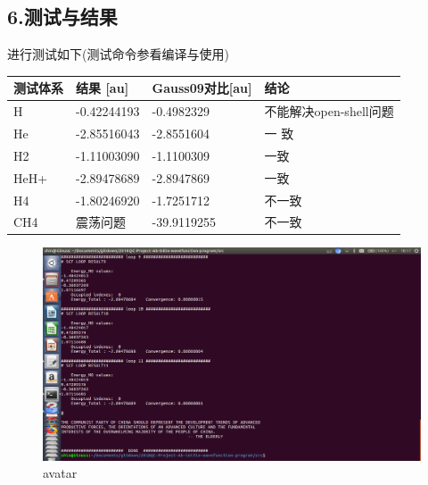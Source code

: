 \documentclass[11pt]{article}
\makeatletter
\def\maxwidth{\ifdim\Gin@nat@width>\linewidth\linewidth
    \else\Gin@nat@width\fi}
\let\Oldincludegraphics\includegraphics
\renewcommand{\includegraphics}[1]{\Oldincludegraphics[width=.8\maxwidth]{#1}}
\makeatother
\begin{document}
    \subsection{6.测试与结果}\label{ux6d4bux8bd5ux4e0eux7ed3ux679c}

进行测试如下(测试命令参看编译与使用)

\begin{longtable}[]{@{}llll@{}}
\toprule
测试体系 & 结果 {[}au{]} & Gauss09对比{[}au{]} & 结论\tabularnewline
\midrule
\endhead
H & -0.42244193 & -0.4982329 & 不能解决open-shell问题\tabularnewline
He & -2.85516043 & -2.8551604 & 一 致\tabularnewline
H2 & -1.11003090 & -1.1100309 & 一致\tabularnewline
HeH+ & -2.89478689 & -2.8947869 & 一致\tabularnewline
H4 & -1.80246920 & -1.7251712 & 不一致\tabularnewline
CH4 & 震荡问题 & -39.9119255 & 不一致\tabularnewline
\bottomrule
\end{longtable}

    \begin{figure}
\centering
\includegraphics{./HeH+.png}
\caption{avatar}
\end{figure}


    
    
    
    
\end{document}
